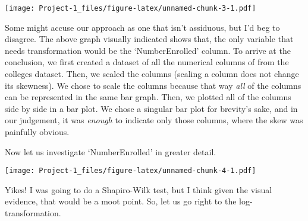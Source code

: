 \documentclass[
]{article}
\newenvironment{Shaded}{\begin{snugshade}}{\end{snugshade}}
\newcommand{\AttributeTok}[1]{\textcolor[rgb]{0.77,0.63,0.00}{#1}}
\newcommand{\FunctionTok}[1]{\textcolor[rgb]{0.00,0.00,0.00}{#1}}
\newcommand{\NormalTok}[1]{#1}
\newcommand{\OtherTok}[1]{\textcolor[rgb]{0.56,0.35,0.01}{#1}}
\newcommand{\SpecialCharTok}[1]{\textcolor[rgb]{0.00,0.00,0.00}{#1}}
\begin{document}
\begin{Shaded}
\end{Shaded}

\texttt{[image: Project-1\_files/figure-latex/unnamed-chunk-3-1.pdf]}

Some might accuse our approach as one that isn't assiduous, but I'd beg
to disagree. The above graph visually indicated shows that, the only
variable that needs transformation would be the `NumberEnrolled' column.
To arrive at the conclusion, we first created a dataset of all the
numerical columns of from the colleges dataset. Then, we scaled the
columns (scaling a column does not change its skewness). We chose to
scale the columns because that way \emph{all} of the columns can be
represented in the same bar graph. Then, we plotted all of the columns
side by side in a bar plot. We chose a singular bar plot for brevity's
sake, and in our judgement, it was \emph{enough} to indicate only those
columns, where the skew was painfully obvious.

Now let us investigate `NumberEnrolled' in greater detail.

\begin{Shaded}
\end{Shaded}

\texttt{[image: Project-1\_files/figure-latex/unnamed-chunk-4-1.pdf]}

Yikes! I was going to do a Shapiro-Wilk test, but I think given the
visual evidence, that would be a moot point. So, let us go right to the
log-transformation.

\begin{Shaded}
\end{Shaded}
\end{document}
